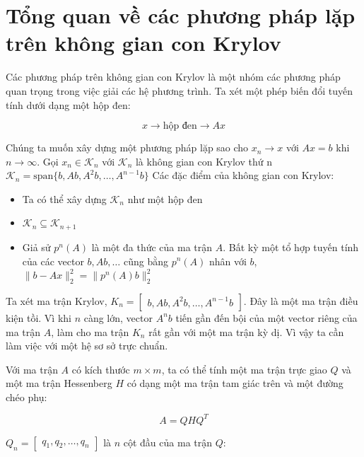 \documentclass[14pt, a4paper]{article}
\numberwithin{equation}{section}
\numberwithin{algorithm}{section}
\numberwithin{figure}{section}
\numberwithin{dl}{section}
\numberwithin{md}{section}
\numberwithin{bd}{section}
\numberwithin{dn}{section}
\begin{document}
\section{Tổng quan về các phương pháp lặp trên không gian con Krylov}

Các phương pháp trên không gian con Krylov là một nhóm các phương pháp quan trọng trong việc giải các hệ phương trình. Ta xét một phép biến đổi tuyến tính dưới dạng một hộp đen:

\begin{equation}
    x \rightarrow \boxed{\text{hộp đen}} \rightarrow Ax
\end{equation}

Chúng ta muốn xây dựng một phương pháp lặp sao cho $x_n \rightarrow x$ với $Ax=b$ khi $n \rightarrow \infty$. Gọi $x_n \in \mathcal{K}_n$ với $\mathcal{K}_n$ là không gian con Krylov thứ n $\mathcal{K}_n=\mathrm{span} \lbrace b, Ab, A^2b, \dots, A^{n-1}b \rbrace$
Các đặc điểm của không gian con Krylov:
\begin{itemize}
    \item Ta có thể xây dựng $\mathcal{K}_n$ như một hộp đen
    \item $\mathcal{K}_n \subseteq \mathcal{K}_{n+1}$
    \item Giả sử $p^n(A)$ là một đa thức của ma trận $A$. Bất kỳ một tổ hợp tuyến tính của các vector $b, Ab, \dots$ cũng bằng $p^n(A)$ nhân với $b$, $\lVert b - Ax \rVert_2^2 = \lVert p^n(A)b \rVert_2^2$
\end{itemize}

Ta xét ma trận Krylov, $K_n = \begin{bmatrix} b, Ab, A^2b, \dots, A^{n-1}b \end{bmatrix}$. Đây là một ma trận điều kiện tồi. Vì khi $n$ càng lớn, vector $A^nb$ tiến gần đến bội của một vector riêng của ma trận $A$, làm cho ma trận $K_n$ rất gần với một ma trận kỳ dị. Vì vậy ta cần làm việc với một hệ sơ sở trực chuẩn.

Với ma trận $A$ có kích thước $m \times m$, ta có thể tính một ma trận trực giao $Q$ và một ma trận Hessenberg $H$ có dạng một ma trận tam giác trên và một đường chéo phụ:

\begin{equation} \label{eq:AQHQ}
    A = QHQ^T
\end{equation}

$Q_n=\begin{bmatrix} q_1, q_2, \dots, q_n \end{bmatrix}$ là $n$ cột đầu của ma trận $Q$:
\end{document}
